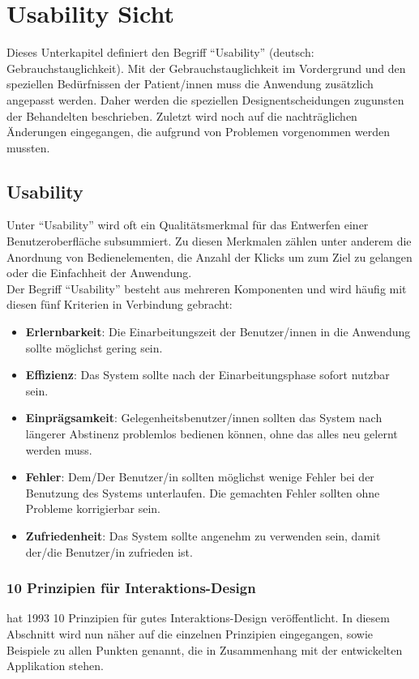\section{Usability Sicht}
Dieses Unterkapitel definiert den Begriff \enquote{Usability} (deutsch: Gebrauchstauglichkeit). Mit der Gebrauchstauglichkeit im Vordergrund und den speziellen Bedürfnissen der Patient/innen muss die Anwendung zusätzlich angepasst werden. Daher werden die speziellen Designentscheidungen zugunsten der Behandelten beschrieben. Zuletzt wird noch auf die nachträglichen Änderungen eingegangen, die aufgrund von Problemen vorgenommen werden mussten.

\subsection{Usability}
Unter \enquote{Usability} wird oft ein Qualitätsmerkmal für das Entwerfen einer Benutzeroberfläche subsummiert. Zu diesen Merkmalen zählen unter anderem die Anordnung von Bedienelementen, die Anzahl der Klicks um zum Ziel zu gelangen oder die Einfachheit der Anwendung. \cite{richter:2013:usability} \\ 
Der Begriff \enquote{Usability} besteht aus mehreren Komponenten und wird häufig mit diesen fünf Kriterien in Verbindung gebracht: \cite{nielsen:1993:usability}

\begin{itemize}
    \item \textbf{Erlernbarkeit}: Die Einarbeitungszeit der Benutzer/innen in die Anwendung sollte möglichst gering sein.
    \item \textbf{Effizienz}: Das System sollte nach der Einarbeitungsphase sofort nutzbar sein.
    \item \textbf{Einprägsamkeit}: Gelegenheitsbenutzer/innen sollten das System nach längerer Abstinenz problemlos bedienen können, ohne das alles neu gelernt werden muss.
    \item \textbf{Fehler}: Dem/Der Benutzer/in sollten möglichst wenige Fehler bei der Benutzung des Systems unterlaufen. Die gemachten Fehler sollten ohne Probleme korrigierbar sein.
    \item \textbf{Zufriedenheit}: Das System sollte angenehm zu verwenden sein, damit der/die Benutzer/in zufrieden ist.
\end{itemize}

\subsubsection{10 Prinzipien für Interaktions-Design}
\citeauthor{nielsen:1993:usability} hat 1993 10 Prinzipien für gutes Interaktions-Design veröffentlicht. In diesem Abschnitt wird nun näher auf die einzelnen Prinzipien eingegangen, sowie Beispiele zu allen Punkten genannt, die in Zusammenhang mit der entwickelten Applikation stehen.

